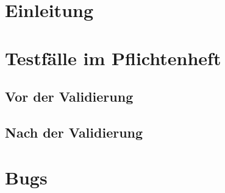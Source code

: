 \documentclass[10pt]{scrreprt}
\begin{document}
\pagebreak
\rmfamily
\tableofcontents

\chapter{Einleitung}

\chapter{Testfälle im Pflichtenheft}
\section{Vor der Validierung}
\section{Nach der Validierung}

\chapter{Bugs}
\end{document}
